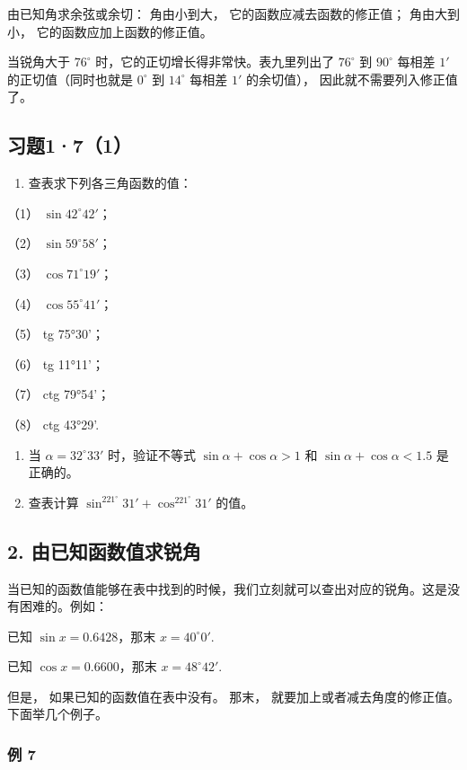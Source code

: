 由已知角求余弦或余切： 角由小到大， 它的函数应减去函数的修正值；
角由大到小， 它的函数应加上函数的修正值。

当锐角大于 \(76^{\circ}\) 时，它的正切增长得非常快。表九里列出了
\(76^{\circ}\) 到 \(90^{\circ}\) 每相差 \(1'\) 的正切值（同时也就是
\(0^{\circ}\) 到 \(14^{\circ}\) 每相差 \(1'\) 的余切值），
因此就不需要列入修正值了。

\subsection{习题1·7（1）}

\begin{enumerate}
\item
  查表求下列各三角函数的值：
\end{enumerate}

（1） \(\sin 42^{\circ}42'\)；

（2） \(\sin 59^{\circ}58'\)；

（3） \(\cos 71^{\circ}19'\)；

（4） \(\cos 55^{\circ}41'\)；

（5） tg 75°30'；

（6） tg 11°11'；

（7） ctg 79°54'；

（8） ctg 43°29'.

\begin{enumerate}[start=2]
\item
  当 \(\alpha = 32^{\circ}33'\) 时，验证不等式
  \(\sin \alpha + \cos \alpha > 1\) 和
  \(\sin \alpha + \cos \alpha < 1.5\) 是正确的。
\item
  查表计算 \(\sin^221^\circ 31' + \cos^221^\circ 31'\) 的值。
\end{enumerate}

\subsection{2. 由已知函数值求锐角}

当已知的函数值能够在表中找到的时候，我们立刻就可以查出对应的锐角。这是没有困难的。例如：

已知 \(\sin x = 0.6428\)，那末 \(x = 40^{\circ}0'\).

已知 \(\cos x = 0.6600\)，那末 \(x = 48^{\circ}42'\).

但是， 如果已知的函数值在表中没有。 那末，
就要加上或者减去角度的修正值。 下面举几个例子。

\subsubsection{例 7}

